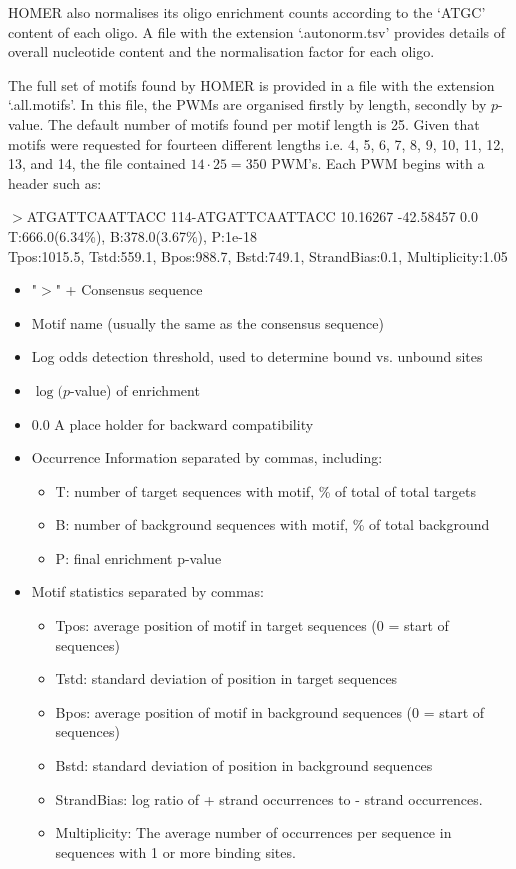 \documentclass[12pt]{article}
\begin{document}
HOMER also normalises its oligo enrichment counts according to the `ATGC' content of each oligo. A file with the extension `.autonorm.tsv' provides details of overall nucleotide content and the normalisation factor for each oligo.

The full set of motifs found by HOMER is provided in a file with the extension `.all.motifs'. In this file, the PWMs are organised firstly by length, secondly by $p$-value. The default number of motifs found per motif length is 25. Given that motifs were requested for fourteen different lengths i.e. 4, 5, 6, 7, 8, 9, 10, 11, 12, 13, and 14, the file contained $14 \cdot 25 = 350$ PWM's. Each PWM begins with a header such as: 


$>$ATGATTCAATTACC	114-ATGATTCAATTACC	
10.16267	-42.58457	0.0\\	T:666.0(6.34\%), B:378.0(3.67\%), P:1e-18\\ Tpos:1015.5, Tstd:559.1, Bpos:988.7, Bstd:749.1, StrandBias:0.1, Multiplicity:1.05
\begin{itemize}
\item"$>$" + Consensus sequence 
\item Motif name (usually the same as the consensus sequence)
\item Log odds detection threshold, used to determine bound vs. unbound sites 
\item $\log(p$-value) of enrichment
\item 0.0  A place holder for backward compatibility
\item Occurrence Information separated by commas, including:
\begin{itemize}
\item T: number of target sequences with motif, \% of total of total targets
\item B: number of background sequences with motif, \% of total background
\item P: final enrichment p-value
\end{itemize}
\item Motif statistics separated by commas: 
\begin{itemize}
\item Tpos: average position of motif in target sequences (0 = start of sequences)
\item Tstd: standard deviation of position in target sequences
\item Bpos: average position of motif in background sequences (0 = start of sequences)
\item Bstd: standard deviation of position in background sequences
\item StrandBias: log ratio of + strand occurrences to - strand occurrences.
\item Multiplicity: The average number of occurrences per sequence in sequences with 1 or more binding sites.
\end{itemize}
\end{itemize}
\end{document}
